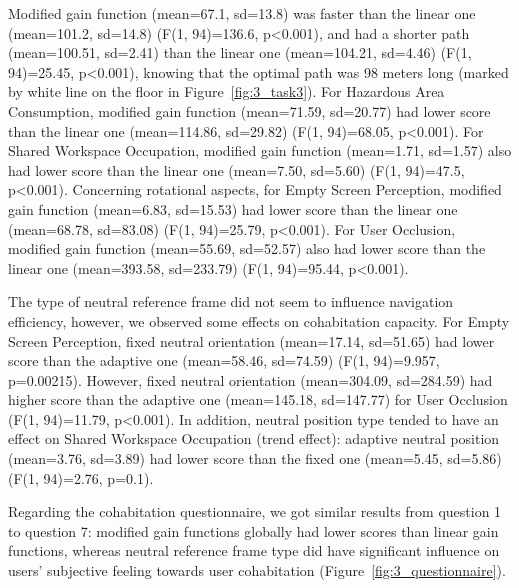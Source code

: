 Modified gain function (mean=67.1, sd=13.8) was faster than the linear one (mean=101.2, sd=14.8) (F(1, 94)=136.6, p\textless 0.001), and had a shorter path (mean=100.51, sd=2.41) than the linear one (mean=104.21, sd=4.46) (F(1, 94)=25.45, p\textless 0.001), knowing that the optimal path was 98 meters long (marked by white line on the floor in Figure~\ref{fig:3_task3}). For Hazardous Area Consumption, modified gain function (mean=71.59, sd=20.77) had lower score than the linear one (mean=114.86, sd=29.82) (F(1, 94)=68.05, p\textless 0.001). For Shared Workspace Occupation, modified gain function (mean=1.71, sd=1.57) also had lower score than the linear one (mean=7.50, sd=5.60) (F(1, 94)=47.5, p\textless 0.001). Concerning rotational aspects, for Empty Screen Perception, modified gain function (mean=6.83, sd=15.53) had lower score than the linear one (mean=68.78, sd=83.08) (F(1, 94)=25.79, p\textless 0.001). For User Occlusion, modified gain function (mean=55.69, sd=52.57) also had lower score than the linear one (mean=393.58, sd=233.79) (F(1, 94)=95.44, p\textless 0.001).

The type of neutral reference frame did not seem to influence navigation efficiency, however, we observed some effects on cohabitation capacity. For Empty Screen Perception, fixed neutral orientation (mean=17.14, sd=51.65) had lower score than the adaptive one (mean=58.46, sd=74.59) (F(1, 94)=9.957, p=0.00215). However, fixed neutral orientation (mean=304.09, sd=284.59) had higher score than the adaptive one (mean=145.18, sd=147.77) for User Occlusion (F(1, 94)=11.79, p\textless 0.001). In addition, neutral position type tended to have an effect on Shared Workspace Occupation (trend effect): adaptive neutral position (mean=3.76, sd=3.89) had lower score than the fixed one (mean=5.45, sd=5.86) (F(1, 94)=2.76, p=0.1).

Regarding the cohabitation questionnaire, we got similar results from question 1 to question 7: modified gain functions globally had lower scores than linear gain functions, whereas neutral reference frame type did have significant influence on users' subjective feeling towards user cohabitation (Figure~\ref{fig:3_questionnaire}).

